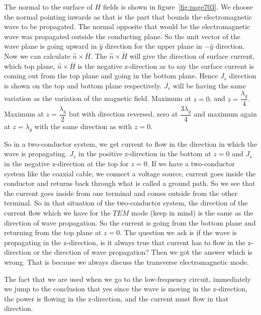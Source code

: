 The normal to the surface of $H$ fields is shown in figure~\ref{fig:page703}. We choose the normal pointing inwards as that is the part that bounds the electromagnetic wave to be propagated. The normal opposite that would be the electromagnetic wave was propagated outside the conducting plane. So the unit vector of the wave plane is going upward in ${\hat{y}}$ direction for the upper plane in ${-\hat{y}}$ direction. Now we can calculate ${\hat{n}\times\bar{H}}$. The ${\hat{n}\times\bar{H}}$ will give the direction of surface current, which top plane, ${\hat{n}\times\bar{H}}$ is the negative z-direction as to say the surface current is coming out from the top plane and going in the bottom plane. Hence ${J_s}$ direction is shown on the top and bottom plane respectively. ${J_s}$ will be having the same variation as the variation of the magnetic field. Maximum at $z=0$, and ${z= \dfrac{\lambda_g}{4}}$. Maximum at ${z=\dfrac{\lambda_g}{2}}$ but with direction reversed, zero at ${\dfrac{3\lambda_g}{4}}$ and maximum again at ${z=\lambda_g}$ with the same direction as with $z=0$. 

So in a two-conductor system, we get current to flow in the direction in which the wave is propagating. ${J_s}$ in the positive z-direction in the bottom at $z=0$ and ${J_s}$ in the negative z-direction at the top for $z=0$. If we have a two-conductor system like the coaxial cable, we connect a voltage source, current goes inside the conductor and returns back through what is called a ground path. So we see that the current goes inside from one terminal and comes outside from the other terminal. So in that situation of the two-conductor system, the direction of the current flow which we have for the $TEM$ mode (keep in mind) is the same as the direction of wave propagation. So the current is going from the bottom plane and returning from the top plane at $z=0$. The question we ask is if the wave is propagating in the z-direction, is it always true that current has to flow in the z-direction or the direction of wave propagation? Then we got the answer which is wrong. That is because we always discuss the transverse electromagnetic mode.

The fact that we are used when we go to the low-frequency circuit, immediately we jump to the conclusion that yes since the wave is moving in the z-direction, the power is flowing in the z-direction, and the current must flow in that direction.

